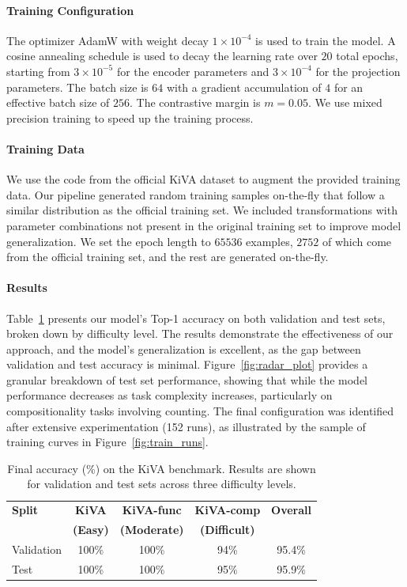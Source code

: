\documentclass[twocolumn]{article} %
\begin{document}
\paragraph{Training Configuration}
The optimizer AdamW with weight decay $1 \times 10^{-4}$ is used to train the model. 
A cosine annealing schedule is used to decay the learning rate over $20$ total epochs, starting from $3 \times 10^{-5}$ for the encoder parameters and $3 \times 10^{-4}$ for the projection parameters. The batch size is $64$ with a gradient accumulation of $4$ for an effective batch size of $256$. The contrastive margin is $m = 0.05$.
We use mixed precision training to speed up the training process.

\paragraph{Training Data}
We use the code from the official KiVA dataset \cite{yee2025kiva} to augment the provided training data. Our pipeline generated random training samples on-the-fly that follow a similar distribution as the official training set. We included transformations with parameter combinations not present in the original training set to improve model generalization. We set the epoch length to $65536$ examples, $2752$ of which come from the official training set, and the rest are generated on-the-fly.

\paragraph{Results}
Table~\ref{tab:kiva_results} presents our model's Top-1 accuracy on both validation and test sets, broken down by difficulty level. The results demonstrate the effectiveness of our approach, and the model's generalization is excellent, as the gap between validation and test accuracy is minimal. Figure~\ref{fig:radar_plot} provides a granular breakdown of test set performance, showing that while the model performance decreases as task complexity increases, particularly on compositionality tasks involving counting. The final configuration was identified after extensive experimentation (152 runs), as illustrated by the sample of training curves in Figure~\ref{fig:train_runs}.

\begin{table}[!htb]
    \caption{Final accuracy (\%) on the KiVA benchmark. Results are shown for validation and test sets across three difficulty levels.}
    \label{tab:kiva_results}
    \centering
    \setlength{\tabcolsep}{5pt} %
    \begin{tabular}{lcccc}
        \toprule
        \textbf{Split} & \textbf{KiVA} & \textbf{KiVA-func} & \textbf{KiVA-comp} & \textbf{Overall} \\
        & \textbf{(Easy)} & \textbf{(Moderate)} & \textbf{(Difficult)} & \\
        \midrule
        Validation & 100\% & 100\% & 94\% & 95.4\% \\
        Test & 100\% & 100\% & 95\% & 95.9\% \\
        \bottomrule
    \end{tabular}
\end{table}
\end{document}
